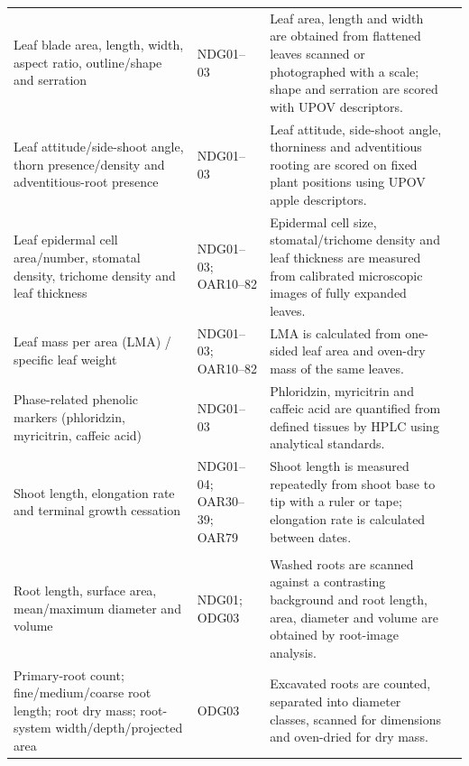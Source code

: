 \begin{landscape}
\begin{longtable}{>{\RaggedRight\arraybackslash}p{5.1cm} >{\RaggedRight\arraybackslash}p{2.3cm} >{\RaggedRight\arraybackslash}p{16.7cm} >{\RaggedRight\arraybackslash}p{2.4cm}}
Leaf blade area, length, width, aspect ratio, outline/shape and serration &
NDG01--03 &
Leaf area, length and width are obtained from flattened leaves scanned or photographed with a scale; shape and serration are scored with UPOV descriptors. &
\citep{upov2023apple}\\

Leaf attitude/side-shoot angle, thorn presence/density and adventitious-root presence &
NDG01--03 &
Leaf attitude, side-shoot angle, thorniness and adventitious rooting are scored on fixed plant positions using UPOV apple descriptors. &
\citep{upov2023apple}\\

Leaf epidermal cell area/number, stomatal density, trichome density and leaf thickness &
NDG01--03; OAR10--82 &
Epidermal cell size, stomatal/trichome density and leaf thickness are measured from calibrated microscopic images of fully expanded leaves. &
\citep{jia2024}\\

Leaf mass per area (LMA) / specific leaf weight &
NDG01--03; OAR10--82 &
LMA is calculated from one-sided leaf area and oven-dry mass of the same leaves. &
\citep{migicovsky2018,schechter1992}\\

Phase-related phenolic markers (phloridzin, myricitrin, caffeic acid) &
NDG01--03 &
Phloridzin, myricitrin and caffeic acid are quantified from defined tissues by HPLC using analytical standards. &
\citep{zhang2007}\\

Shoot length, elongation rate and terminal growth cessation &
NDG01--04; OAR30--39; OAR79 &
Shoot length is measured repeatedly from shoot base to tip with a ruler or tape; elongation rate is calculated between dates. &
\citep{wang2020}\\

\multicolumn{4}{l}{\textbf{Root system}}\\
Root length, surface area, mean/maximum diameter and volume &
NDG01; ODG03 &
Washed roots are scanned against a contrasting background and root length, area, diameter and volume are obtained by root-image analysis. &
\citep{liu2019,serrano2023}\\

Primary-root count; fine/medium/coarse root length; root dry mass; root-system width/depth/projected area &
ODG03 &
Excavated roots are counted, separated into diameter classes, scanned for dimensions and oven-dried for dry mass. &
\citep{serrano2023}\\


\end{longtable}
\end{landscape}
